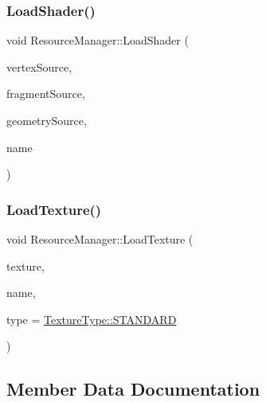 \mbox{\label{class_resource_manager_a00f5f597ddb23cfc50f5215e0768a336}} 
\subsubsection{\texorpdfstring{LoadShader()}{LoadShader()}}
{\footnotesize\ttfamily void Resource\+Manager\+::\+Load\+Shader (\begin{DoxyParamCaption}\item[{const G\+Lchar $\ast$}]{vertex\+Source,  }\item[{const G\+Lchar $\ast$}]{fragment\+Source,  }\item[{const G\+Lchar $\ast$}]{geometry\+Source,  }\item[{std\+::string}]{name }\end{DoxyParamCaption})\hspace{0.3cm}{\ttfamily [static]}}

\mbox{\label{class_resource_manager_abe39b263c98ff63a9ce991b171356982}} 
\subsubsection{\texorpdfstring{LoadTexture()}{LoadTexture()}}
{\footnotesize\ttfamily void Resource\+Manager\+::\+Load\+Texture (\begin{DoxyParamCaption}\item[{const G\+Lchar $\ast$}]{texture,  }\item[{std\+::string}]{name,  }\item[{\mbox{\hyperlink{_texture_8h_a65468556d79304b3a4bfc464cc12e549}{Texture\+Type}}}]{type = {\ttfamily \mbox{\hyperlink{_texture_8h_a65468556d79304b3a4bfc464cc12e549a94e94133f4bdc1794c6b647b8ea134d0}{Texture\+Type\+::\+S\+T\+A\+N\+D\+A\+RD}}} }\end{DoxyParamCaption})\hspace{0.3cm}{\ttfamily [static]}}



\subsection{Member Data Documentation}
\mbox{\label{class_resource_manager_a8c1bc8fe6e0f92ab3c7e2dca94b0e491}} 
